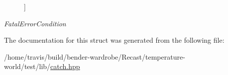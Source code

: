 \begin{Desc}
\begin{description}
{}]\item[{\em 
\hypertarget{struct_catch_1_1_result_was_a624e1ee3661fcf6094ceef1f654601efa87fa1f2a2a63290b61948002e2935377}{Fatal\-Error\-Condition}\label{struct_catch_1_1_result_was_a624e1ee3661fcf6094ceef1f654601efa87fa1f2a2a63290b61948002e2935377}
}]\end{description}
\end{Desc}


The documentation for this struct was generated from the following file\-:\begin{DoxyCompactItemize}
\item 
/home/travis/build/bender-\/wardrobe/\-Recast/temperature-\/world/test/lib/\hyperlink{catch_8hpp}{catch.\-hpp}\end{DoxyCompactItemize}
